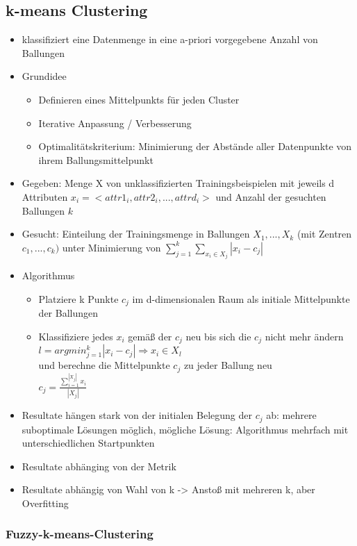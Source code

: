 \documentclass[paper=a4, fontsize=11pt]{scrartcl} %
\numberwithin{equation}{section} %
\numberwithin{figure}{section} %
\numberwithin{table}{section} %
\begin{document}
\subsection{k-means Clustering}

\begin{itemize}
\item klassifiziert eine Datenmenge in eine a-priori vorgegebene Anzahl von Ballungen
\item Grundidee
\begin{itemize}
\item Definieren eines Mittelpunkts für jeden Cluster
\item Iterative Anpassung / Verbesserung
\item Optimalitätskriterium: Minimierung der Abstände aller Datenpunkte von ihrem Ballungsmittelpunkt
\end{itemize}
\item Gegeben: Menge X von unklassifizierten Trainingsbeispielen mit jeweils d Attributen $x_i = < attr1_i, attr2_i, ..., attrd_i>$ und Anzahl der gesuchten Ballungen $k$
\item Gesucht: Einteilung der Trainingsmenge in Ballungen $X_1,...,X_k$ (mit Zentren $c_1,...,c_k)$ unter Minimierung von $\sum\limits_{j=1}^k \sum\limits_{x_i \in X_j} |x_i - c_j|$
\item Algorithmus
\begin{itemize}
\item Platziere k Punkte $c_j$ im d-dimensionalen Raum als initiale Mittelpunkte der Ballungen
\item Klassifiziere jedes $x_i$ gemäß der $c_j$ neu bis sich die $c_j$ nicht mehr ändern\\ $ l = arg min_{j=1}^k |x_i-c_j| \Rightarrow x_i \in X_l$\\ 
und berechne die Mittelpunkte $c_j$ zu jeder Ballung neu\\ $c_j = \frac{\sum\limits_{i=1}^{|X_j|}x_i}{|X_j|}$
\end{itemize}
\item Resultate hängen stark von der initialen Belegung der $c_j$ ab: mehrere suboptimale Lösungen möglich, mögliche Lösung: Algorithmus mehrfach mit unterschiedlichen Startpunkten
\item Resultate abhänging von der Metrik
\item Resultate abhängig von Wahl von k -> Anstoß mit mehreren k, aber Overfitting
\end{itemize}

\subsubsection{Fuzzy-k-means-Clustering}
\end{document}
